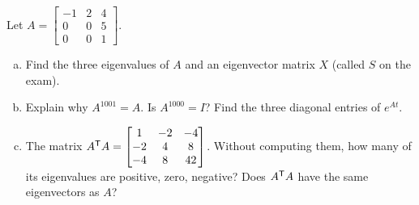 \begin{exercise}\label{exr:u38-q2}
Let $A=\begin{bmatrix}-1&2&4\\0&0&5\\0&0&1\end{bmatrix}$.
\begin{enumerate}[(a)]
\item Find the three eigenvalues of $A$ and an eigenvector matrix $X$ (called $S$ on the exam).
\item Explain why $A^{1001}=A$. Is $A^{1000}=I$? Find the three diagonal entries of $e^{At}$.
\item The matrix $A^{\mathsf{T}} A=\begin{bmatrix}1&-2&-4\\-2&4&8\\-4&8&42\end{bmatrix}$. Without computing them, how many of its eigenvalues are positive, zero, negative? Does $A^{\mathsf{T}} A$ have the same eigenvectors as $A$?
\end{enumerate}
\end{exercise}
